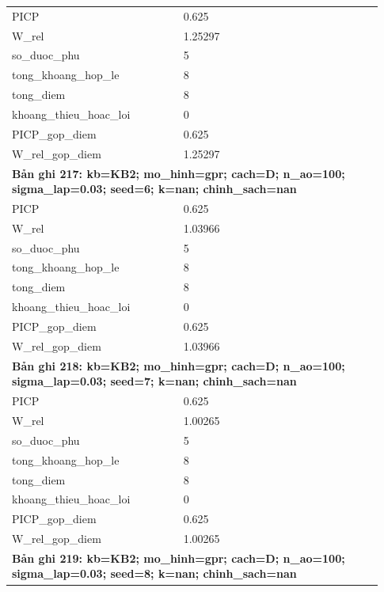 \begin{longtable}{p{0.43\linewidth}p{0.50\linewidth}}
PICP & 0.625 \\
W\_\allowbreak rel & 1.25297 \\
so\_\allowbreak duoc\_\allowbreak phu & 5 \\
tong\_\allowbreak khoang\_\allowbreak hop\_\allowbreak le & 8 \\
tong\_\allowbreak diem & 8 \\
khoang\_\allowbreak thieu\_\allowbreak hoac\_\allowbreak loi & 0 \\
PICP\_\allowbreak gop\_\allowbreak diem & 0.625 \\
W\_\allowbreak rel\_\allowbreak gop\_\allowbreak diem & 1.25297 \\
\midrule
\multicolumn{2}{p{0.95\linewidth}}{\textbf{Bản ghi 217: kb=KB2; mo\_hinh=gpr; cach=D; n\_ao=100; sigma\_lap=0.03; seed=6; k=nan; chinh\_sach=nan}} \\
PICP & 0.625 \\
W\_\allowbreak rel & 1.03966 \\
so\_\allowbreak duoc\_\allowbreak phu & 5 \\
tong\_\allowbreak khoang\_\allowbreak hop\_\allowbreak le & 8 \\
tong\_\allowbreak diem & 8 \\
khoang\_\allowbreak thieu\_\allowbreak hoac\_\allowbreak loi & 0 \\
PICP\_\allowbreak gop\_\allowbreak diem & 0.625 \\
W\_\allowbreak rel\_\allowbreak gop\_\allowbreak diem & 1.03966 \\
\midrule
\multicolumn{2}{p{0.95\linewidth}}{\textbf{Bản ghi 218: kb=KB2; mo\_hinh=gpr; cach=D; n\_ao=100; sigma\_lap=0.03; seed=7; k=nan; chinh\_sach=nan}} \\
PICP & 0.625 \\
W\_\allowbreak rel & 1.00265 \\
so\_\allowbreak duoc\_\allowbreak phu & 5 \\
tong\_\allowbreak khoang\_\allowbreak hop\_\allowbreak le & 8 \\
tong\_\allowbreak diem & 8 \\
khoang\_\allowbreak thieu\_\allowbreak hoac\_\allowbreak loi & 0 \\
PICP\_\allowbreak gop\_\allowbreak diem & 0.625 \\
W\_\allowbreak rel\_\allowbreak gop\_\allowbreak diem & 1.00265 \\
\midrule
\multicolumn{2}{p{0.95\linewidth}}{\textbf{Bản ghi 219: kb=KB2; mo\_hinh=gpr; cach=D; n\_ao=100; sigma\_lap=0.03; seed=8; k=nan; chinh\_sach=nan}} \\

\end{longtable}
